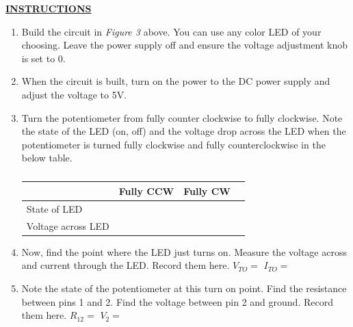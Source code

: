 \documentclass[12pt]{article}
\begin{document}
\textbf{\underline{INSTRUCTIONS}}
\begin{enumerate}
    \item Build the circuit in \textit{Figure 3} above. You can use any color LED of your choosing. Leave the power supply off and ensure the voltage adjustment knob is set to 0.
    \item When the circuit is built, turn on the power to the DC power supply and adjust the voltage to 5V.
    \item Turn the potentiometer from fully counter clockwise to fully clockwise. Note the state of the LED (on, off) and the voltage drop across the LED when the potentiometer is turned fully clockwise and fully counterclockwise in the below table.
        \begin{table}[H]
        \centering
        \begin{tabular}{|l||l|l|l|} %
            \hline
                 &  Fully CCW & Fully CW   \\ \hline \hline
                 State of LED &     &       \\ \hline
                 Voltage across LED &     &       \\ \hline
        \end{tabular}
        \caption{}
        \end{table}
    \item Now, find the point where the LED just turns on. Measure the voltage across and current through the LED. Record them here. $V_{TO} = $ \underline{\hspace{2cm}} $I_{TO} = $ \underline{\hspace{2cm}}
    \item Note the state of the potentiometer at this turn on point. Find the resistance between pins 1 and 2. Find the voltage between pin 2 and ground. Record them here. $R_{12} = $ \underline{\hspace{2cm}} $V_{2} = $ \underline{\hspace{2cm}}
    
\end{enumerate}
\end{document}
